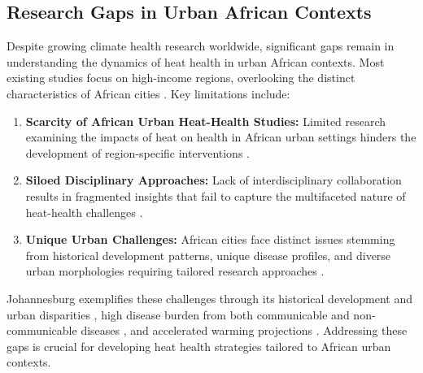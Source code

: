 \subsection{Research Gaps in Urban African Contexts}
Despite growing climate health research worldwide, significant gaps remain in understanding the dynamics of heat health in urban African contexts. Most existing studies focus on high-income regions, overlooking the distinct characteristics of African cities \citep{Khine2023, Pasquini2020}. Key limitations include:

\begin{enumerate}
    \item \textbf{Scarcity of African Urban Heat-Health Studies:} Limited research examining the impacts of heat on health in African urban settings hinders the development of region-specific interventions \citep{Ncongwane2021, Wright2019}.

    \item \textbf{Siloed Disciplinary Approaches:} Lack of interdisciplinary collaboration results in fragmented insights that fail to capture the multifaceted nature of heat-health challenges \citep{Jack}.

    \item \textbf{Unique Urban Challenges:} African cities face distinct issues stemming from historical development patterns, unique disease profiles, and diverse urban morphologies requiring tailored research approaches \citep{Giombini2022, Venter2020}.
\end{enumerate}

Johannesburg exemplifies these challenges through its historical development and urban disparities \citep{Strauss2019}, high disease burden from both communicable and non-communicable diseases \citep{Wright2021}, and accelerated warming projections \citep{Engelbrecht2015, Souverijns2022}. Addressing these gaps is crucial for developing heat health strategies tailored to African urban contexts.